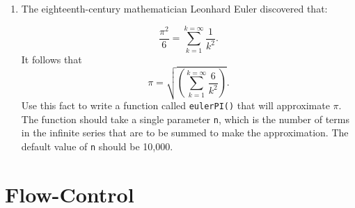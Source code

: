 \documentclass[]{book}
\makeatletter
\newenvironment{Shaded}{\begin{snugshade}}{\end{snugshade}}
\newcommand{\KeywordTok}[1]{\textcolor[rgb]{0.13,0.29,0.53}{\textbf{#1}}}
\newcommand{\DataTypeTok}[1]{\textcolor[rgb]{0.13,0.29,0.53}{#1}}
\newcommand{\DecValTok}[1]{\textcolor[rgb]{0.00,0.00,0.81}{#1}}
\newcommand{\StringTok}[1]{\textcolor[rgb]{0.31,0.60,0.02}{#1}}
\newcommand{\NormalTok}[1]{#1}
\newenvironment{kframe}{%
\medskip{}
\setlength{\fboxsep}{.8em}
 \def\at@end@of@kframe{}%
 \ifinner\ifhmode%
  \def\at@end@of@kframe{\end{minipage}}%
  \begin{minipage}{\columnwidth}%
 \fi\fi%
 \def\FrameCommand##1{\hskip\@totalleftmargin \hskip-\fboxsep
 \colorbox{shadecolor}{##1}\hskip-\fboxsep
     \hskip-\linewidth \hskip-\@totalleftmargin \hskip\columnwidth}%
 \MakeFramed {\advance\hsize-\width
   \@totalleftmargin\z@ \linewidth\hsize
   \@setminipage}}%
 {\par\unskip\endMakeFramed%
 \at@end@of@kframe}
\renewenvironment{Shaded}{\begin{kframe}}{\end{kframe}}
\theoremstyle{definition}
\theoremstyle{definition}
\theoremstyle{definition}
\theoremstyle{remark}
\makeatother
\begin{document}
{\begin{enumerate}
  Write a function called \texttt{isPalindrome()} that, when given any
  vector, will return \texttt{TRUE} if the vector is a palindrome and
  \texttt{FALSE} if it is not a palindrome. The function should take a
  single parameter called \texttt{vec}, with no default value. Typical
  examples of use should be:

\begin{Shaded}
\begin{Highlighting}[]
\KeywordTok{isPalindrome}\NormalTok{(}\DataTypeTok{vec =} \KeywordTok{c}\NormalTok{(}\StringTok{"Bob"}\NormalTok{, }\StringTok{"Marley"}\NormalTok{, }\StringTok{"Bob"}\NormalTok{))}
\end{Highlighting}
\end{Shaded}

\begin{verbatim}
## [1] TRUE
\end{verbatim}

\begin{Shaded}
\begin{Highlighting}[]
\KeywordTok{isPalindrome}\NormalTok{(}\KeywordTok{c}\NormalTok{(}\DecValTok{3}\NormalTok{,}\DecValTok{2}\NormalTok{,}\DecValTok{7}\NormalTok{,}\DecValTok{4}\NormalTok{,}\DecValTok{3}\NormalTok{))}
\end{Highlighting}
\end{Shaded}

\begin{verbatim}
## [1] FALSE
\end{verbatim}

  \textbf{Hint:} You already have the function \texttt{reverse()} from
  the previous Exercise. Use this function, along with the Boolean
  operator \texttt{==} and the \texttt{all()} function.
\item
  The eighteenth-century mathematician Leonhard Euler discovered that:

  \[\frac{\pi^2}{6} = \sum_{k=1}^{k=\infty} \frac{1}{k^2}.\] It follows
  that
  \[\pi = \sqrt{\left(\sum_{k=1}^{k=\infty} \frac{6}{k^2}\right)}.\] Use
  this fact to write a function called \texttt{eulerPI()} that will
  approximate \(\pi\). The function should take a single parameter
  \texttt{n}, which is the number of terms in the infinite series that
  are to be summed to make the approximation. The default value of
  \texttt{n} should be 10,000.
\end{enumerate}

\chapter{Flow-Control}\label{flow}

}
\end{document}
